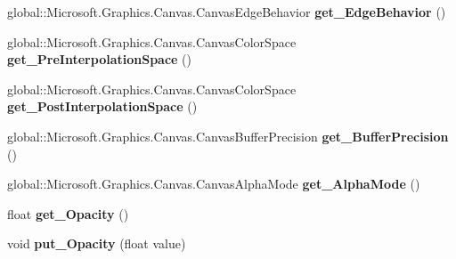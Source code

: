 \begin{DoxyCompactItemize}
global\+::\+Microsoft.\+Graphics.\+Canvas.\+Canvas\+Edge\+Behavior {\bfseries get\+\_\+\+Edge\+Behavior} ()
\item 
\mbox{\label{class_microsoft_1_1_graphics_1_1_canvas_1_1_brushes_1_1_canvas_radial_gradient_brush_aa72bdc01bbe7dd17dd854e9bb242e6c9}} 
global\+::\+Microsoft.\+Graphics.\+Canvas.\+Canvas\+Color\+Space {\bfseries get\+\_\+\+Pre\+Interpolation\+Space} ()
\item 
\mbox{\label{class_microsoft_1_1_graphics_1_1_canvas_1_1_brushes_1_1_canvas_radial_gradient_brush_a785455e32693ce5dfe7078cfda12ceb4}} 
global\+::\+Microsoft.\+Graphics.\+Canvas.\+Canvas\+Color\+Space {\bfseries get\+\_\+\+Post\+Interpolation\+Space} ()
\item 
\mbox{\label{class_microsoft_1_1_graphics_1_1_canvas_1_1_brushes_1_1_canvas_radial_gradient_brush_aafd2f6623623d25c32311c900cbd8290}} 
global\+::\+Microsoft.\+Graphics.\+Canvas.\+Canvas\+Buffer\+Precision {\bfseries get\+\_\+\+Buffer\+Precision} ()
\item 
\mbox{\label{class_microsoft_1_1_graphics_1_1_canvas_1_1_brushes_1_1_canvas_radial_gradient_brush_acc50a38d650db9d56c06e7ceccffd903}} 
global\+::\+Microsoft.\+Graphics.\+Canvas.\+Canvas\+Alpha\+Mode {\bfseries get\+\_\+\+Alpha\+Mode} ()
\item 
\mbox{\label{class_microsoft_1_1_graphics_1_1_canvas_1_1_brushes_1_1_canvas_radial_gradient_brush_acd71a294a1a4501f8a3a2b41d2e7af17}} 
float {\bfseries get\+\_\+\+Opacity} ()
\item 
\mbox{\label{class_microsoft_1_1_graphics_1_1_canvas_1_1_brushes_1_1_canvas_radial_gradient_brush_a16b901b253e0b85c05eeb242450257a6}} 
void {\bfseries put\+\_\+\+Opacity} (float value)
\item 
\mbox{\label{class_microsoft_1_1_graphics_1_1_canvas_1_1_brushes_1_1_canvas_radial_gradient_brush_a9289c0459527b50261ca3f4a0eff81ba}} 

\end{DoxyCompactItemize}
